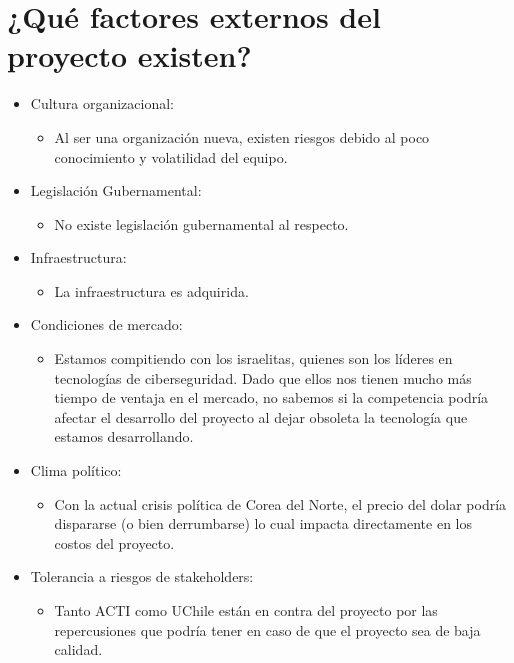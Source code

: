 \documentclass[11pt]{utalcaDoc}
\begin{document}
\section{¿Qué factores externos del proyecto existen?}
\begin{itemize}
  \item{
    Cultura organizacional: 
    \begin{itemize}
      \item{Al ser una organización nueva, existen riesgos debido al poco conocimiento y volatilidad del equipo.}
    \end{itemize}
  }
  \item{
    Legislación Gubernamental: 
    \begin{itemize}
      \item{ No existe legislación gubernamental al respecto.}
    \end{itemize}
  }
  \item{
    Infraestructura: 
    \begin{itemize}
      \item{La infraestructura es adquirida.}
    \end{itemize}
  }
  \item{
    Condiciones de mercado: 
    \begin{itemize}
      \item{Estamos compitiendo con los israelitas, quienes son los líderes en tecnologías de ciberseguridad. Dado que ellos nos tienen mucho más tiempo de ventaja en el mercado, no sabemos si la competencia podría afectar el desarrollo del proyecto al dejar obsoleta la tecnología que estamos desarrollando.}
    \end{itemize}
  }
  \item{
    Clima político: 
    \begin{itemize}
      \item{ Con la actual crisis política de Corea del Norte, el precio del dolar podría dispararse (o bien derrumbarse) lo cual impacta directamente en los costos del proyecto.}
    \end{itemize}
  }
  \item{
    Tolerancia a riesgos de stakeholders: 
    \begin{itemize}
      \item{Tanto ACTI como UChile están en contra del proyecto por las repercusiones que podría tener en caso de que el proyecto sea de baja calidad.}
    \end{itemize}
  }
\end{itemize}
\end{document}
